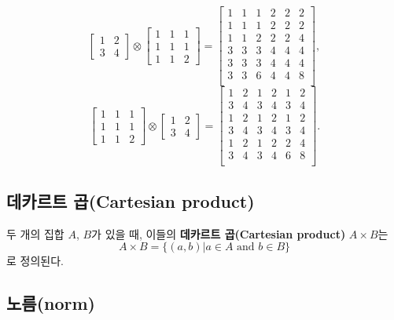 \documentclass[b5paper,]{scrbook}
\theoremstyle{plain}
\theoremstyle{definition}
\numberwithin{equation}{section}
\let\BeginKnitrBlock\begin \let\EndKnitrBlock\end
\begin{document}
\BeginKnitrBlock{example}[행렬의 텐서곱 예시]
\protect\hypertarget{exm:unnamed-chunk-13}{}{\label{exm:unnamed-chunk-13} {} }\[
\begin{bmatrix}
1 & 2\\
3 & 4
\end{bmatrix}
\otimes
\begin{bmatrix}
1 & 1 & 1\\
1 & 1 & 1\\
1 & 1 & 2
\end{bmatrix}
=
\begin{bmatrix}
1 & 1 & 1 & 2 & 2 & 2\\
1 & 1 & 1 & 2 & 2 & 2\\
1 & 1 & 2 & 2 & 2 & 4\\
3 & 3 & 3 & 4 & 4 & 4\\
3 & 3 & 3 & 4 & 4 & 4\\
3 & 3 & 6 & 4 & 4 & 8\\
\end{bmatrix},
\]
\[
\begin{bmatrix}
1 & 1 & 1\\
1 & 1 & 1\\
1 & 1 & 2
\end{bmatrix}
\otimes
\begin{bmatrix}
1 & 2\\
3 & 4
\end{bmatrix}
=
\begin{bmatrix}
1 & 2 & 1 & 2 & 1 & 2\\
3 & 4 & 3 & 4 & 3 & 4\\
1 & 2 & 1 & 2 & 1 & 2\\
3 & 4 & 3 & 4 & 3 & 4\\
1 & 2 & 1 & 2 & 2 & 4\\
3 & 4 & 3 & 4 & 6 & 8\\
\end{bmatrix}.
\]
\EndKnitrBlock{example}

\hypertarget{-cartesian-product}{%
\subsection{데카르트 곱(Cartesian product)}\label{-cartesian-product}}

두 개의 집합 \(A\), \(B\)가 있을 때, 이들의 \textbf{데카르트 곱(Cartesian product)} \(A\times B\)는
\[A\times B = \{ (a,b)| a\in A \text{ and } b \in B\}\]
로 정의된다.

\hypertarget{norm}{%
\subsection{노름(norm)}\label{norm}}
\end{document}
